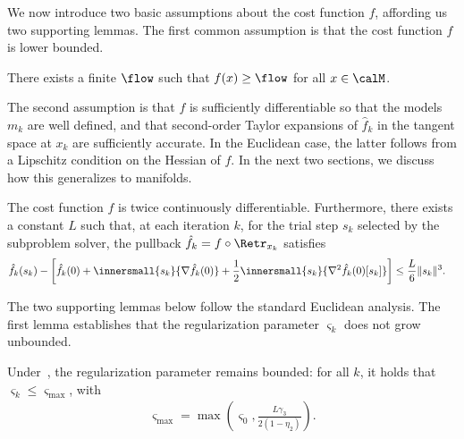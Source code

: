 We now introduce two basic assumptions about the cost function $f$, affording us two supporting lemmas.
The first common assumption is that the cost function $f$ is lower bounded. %
\begin{assumption} \label{assu:lowerbound}
	There exists a finite $\flow$ such that $f(x) \geq \flow$ for all $x \in \calM$.
\end{assumption}
The second assumption is that $f$ is sufficiently differentiable so that the models $m_k$ are well defined, and that second-order Taylor expansions of $\hat f_k$ in the tangent space at $x_k$ are sufficiently accurate. In the Euclidean case, the latter follows from a Lipschitz condition on the Hessian of $f$. In the next two sections, we discuss how this generalizes to manifolds.
\begin{assumption} \label{assu:firstorderregularityscalar}
	The cost function $f$ is twice continuously differentiable.
	Furthermore, there exists a constant $L$ such that, at each iteration $k$, for the trial step $s_k$ selected by the subproblem solver, the pullback $\hat f_k = f \circ \Retr_{x_k}$ satisfies
	\begin{align}
		\hat f_k(s_k) - \left[ \hat f_k(0) + \innersmall{s_k}{\nabla \hat f_k(0)} + \frac{1}{2}\innersmall{s_k}{\nabla^2 \hat f_k(0)[s_k]} \right] & \leq \frac{L}{6} \|s_k\|^3.
	\end{align}
\end{assumption}
The two supporting lemmas below follow the standard Euclidean analysis. The first lemma establishes that the regularization parameter $\varsigma_k$ does not grow unbounded.
\begin{lemma} \label{lem:varsigmamax}
	Under~, the regularization parameter remains bounded: for all $k$, it holds that $\varsigma_k \leq \varsigma_{\max}$, with
	\begin{align}
	\varsigma_{\max} = \max\left( \varsigma_0, \frac{L\gamma_3}{2(1-\eta_2)} \right).
	\label{eq:varsigmamax}
	\end{align}
\end{lemma}
